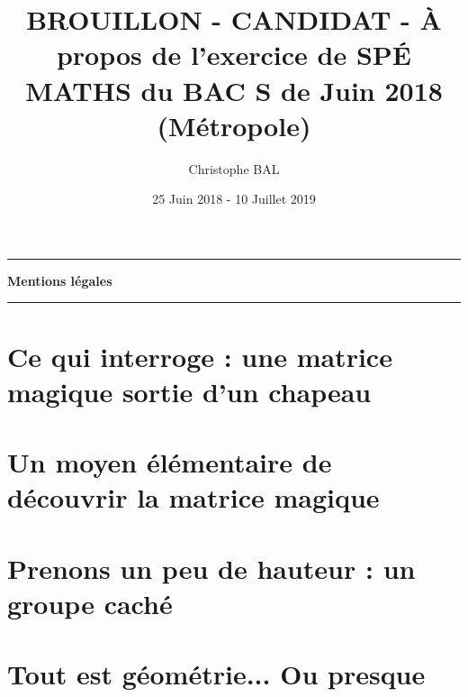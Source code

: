 \documentclass[12pt]{amsart}
\newcommand\squote[1]{\og #1 \fg{}}
\begin{document}
\title{BROUILLON - CANDIDAT - À propos de l'exercice de SPÉ MATHS du BAC S de Juin 2018 (Métropole)}
\author{Christophe BAL}
\date{25 Juin 2018 - 10 Juillet 2019}
\maketitle


\begin{center}
	\hrule\vspace{.3em}
	{
		\fontsize{1.35em}{1em}\selectfont
		\textbf{Mentions \og légales \fg}
	}
			
	\vspace{0.45em}
	\doclicenseThis
	\hrule
\end{center}



\setcounter{tocdepth}{2}
\tableofcontents



\section{Ce qui interroge : une matrice \squote{magique} sortie d'un chapeau}





\section{Un moyen élémentaire de découvrir la matrice \squote{magique}}





\section{Prenons un peu de hauteur : un groupe \squote{caché}}





\section{Tout est géométrie... Ou presque}


\end{document}

